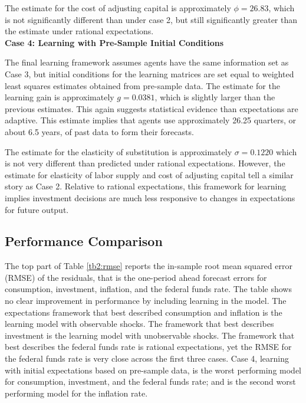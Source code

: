 {The estimate for the cost of adjusting capital is approximately $\phi=26.83$, which is not significantly different than under case 2, but still significantly greater than the estimate under rational expectations. \\

\noindent \textbf{Case 4: Learning with Pre-Sample Initial Conditions}

The final learning framework assumes agents have the same information set as Case 3, but initial conditions for the learning matrices are set equal to weighted least squares estimates obtained from pre-sample data.  The estimate for the learning gain is approximately $g=0.0381$, which is slightly larger than the previous estimates.  This again suggests statistical evidence than expectations are adaptive.  This estimate implies that agents use approximately 26.25 quarters, or about 6.5 years, of past data to form their forecasts.

The estimate for the elasticity of substitution is approximately $\sigma=0.1220$ which is not very different than predicted under rational expectations.  However, the estimate for elasticity of labor supply and cost of adjusting capital tell a similar story as Case 2.  Relative to rational expectations, this framework for learning implies investment decisions are much less responsive to changes in expectations for future output.

\subsection{Performance Comparison}
The top part of Table \ref{tb2:rmse} reports the in-sample root mean squared error (RMSE) of the residuals, that is the one-period ahead forecast errors for consumption, investment, inflation, and the federal funds rate.  The table shows no clear improvement in performance by including learning in the model.  The expectations framework that best described consumption and inflation is the learning model with observable shocks. The framework that best describes investment is the learning model with unobservable shocks.  The framework that best describes the federal funds rate is rational expectations, yet the RMSE for the federal funds rate is very close across the first three cases.  Case 4, learning with initial expectations based on pre-sample data, is the worst performing model for consumption, investment, and the federal funds rate; and is the second worst performing model for the inflation rate. 

}
